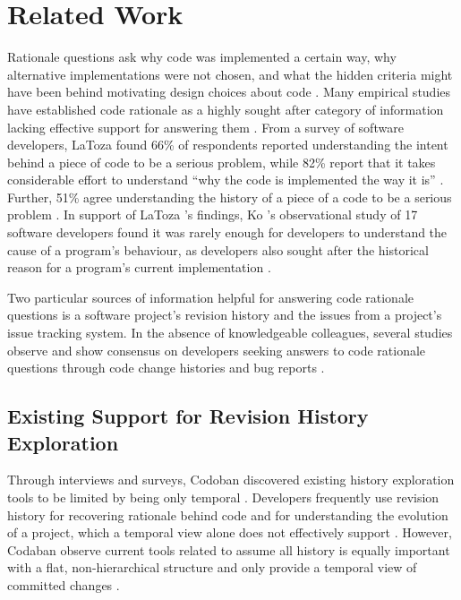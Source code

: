 \chapter{Related Work}
\label{ch:Related-Work}

Rationale questions ask why code was implemented a certain way, why alternative implementations were not chosen, and what the hidden criteria might have been behind motivating design choices about code \cite{latoza_hard-answer_2010}.
Many empirical studies have established code rationale as a highly sought after category of information lacking effective support for answering them \cite{latoza_maintaining_2006, latoza_hard-answer_2010, ko_information_2007}. 
From a survey of software developers, LaToza \etal found 66\% of respondents reported understanding the intent behind a piece of code to be a serious problem, 
while 82\% report that it takes considerable effort to understand ``why the code is implemented the way it is'' \cite{latoza_maintaining_2006}.
Further, 51\% agree understanding the history of a piece of a code to be a serious problem \cite{latoza_maintaining_2006}.
In support of LaToza \etal's findings, Ko \etal's observational study of 17 software developers found it was rarely enough for developers to understand the cause of a program's behaviour, as developers also sought after the historical reason for a program's current implementation \cite{ko_information_2007}.

Two particular sources of information helpful for answering code rationale questions is a software project's revision history and the issues from a project's issue tracking system. 
In the absence of knowledgeable colleagues, several studies observe and show consensus on developers seeking answers to code rationale questions through code change histories and bug reports \cite{ko_information_2007, codoban_software_2015, robillard_turnover-induced_2021}.

\section{Existing Support for Revision History Exploration}

Through interviews and surveys, Codoban \etal discovered existing history exploration tools to be limited by being only temporal \cite{codoban_software_2015}.
Developers frequently use revision history for recovering rationale behind code and for understanding the evolution of a project, which a temporal view alone does not effectively support \cite{codoban_software_2015}.
However, Codaban \etal observe current tools related to  assume all history is equally important with a flat, non-hierarchical structure and only provide a temporal view of committed changes \cite{codoban_software_2015}.

